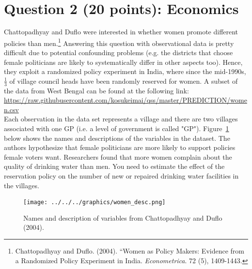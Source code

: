 \documentclass[12pt,letterpaper]{article}
\begin{document}
\section*{Question 2 (20 points): Economics}
Chattopadhyay and Duflo were interested in whether women promote different policies than men.\footnote{Chattopadhyay and Duflo. (2004). ``Women as Policy Makers: Evidence from a Randomized Policy Experiment in India. \textit{Econometrica}. 72 (5), 1409-1443.} Answering this question with observational data is pretty difficult due to potential confounding problems (e.g. the districts that choose female politicians are likely to systematically differ in other aspects too). Hence, they exploit a randomized policy experiment in India, where since the mid-1990s, $\frac{1}{3}$ of village council heads have been randomly reserved for women. A subset of the data from West Bengal can be found at the following link: \url{https://raw.githubusercontent.com/kosukeimai/qss/master/PREDICTION/women.csv}\\

\noindent Each observation in the data set represents a village and there are two villages associated with one GP (i.e. a level of government is called "GP"). Figure~\ref{fig:women_desc} below shows the names and descriptions of the variables in the dataset. The authors hypothesize that female politicians are more likely to support policies female voters want. Researchers found that more women complain about the quality of drinking water than men. You need to estimate the effect of the reservation policy on the number of new or repaired drinking water facilities in the villages.
\vspace{.2cm}
\begin{figure}[h!]
	\caption{\footnotesize{Names and description of variables from Chattopadhyay and Duflo (2004).}}
	\vspace{.5cm}
	\centering
	\label{fig:women_desc}
	\texttt{[image: ../../../graphics/women\_desc.png]}
\end{figure}		
\end{document}
